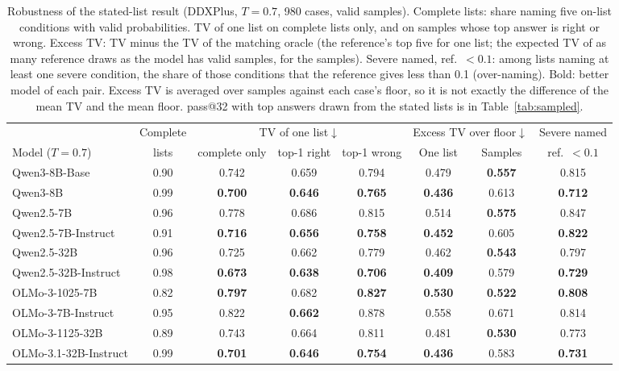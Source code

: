 \documentclass[wcp]{jmlr}
\begin{document}
\begin{table}[t]
\centering\small
\begin{adjustbox}{max width=\linewidth}
\begin{tabular}{lccccccc}
\toprule
 & Complete & \multicolumn{3}{c}{TV of one list$\downarrow$} & \multicolumn{2}{c}{Excess TV over floor$\downarrow$} & Severe named \\
Model ($T{=}0.7$) & lists & complete only & top-1 right & top-1 wrong & One list & Samples & ref.\ $<0.1$ \\
\midrule
Qwen3-8B-Base & 0.90 & 0.742 & 0.659 & 0.794 & 0.479 & \textbf{0.557} & 0.815 \\
Qwen3-8B & 0.99 & \textbf{0.700} & \textbf{0.646} & \textbf{0.765} & \textbf{0.436} & 0.613 & \textbf{0.712} \\
Qwen2.5-7B & 0.96 & 0.778 & 0.686 & 0.815 & 0.514 & \textbf{0.575} & 0.847 \\
Qwen2.5-7B-Instruct & 0.91 & \textbf{0.716} & \textbf{0.656} & \textbf{0.758} & \textbf{0.452} & 0.605 & \textbf{0.822} \\
Qwen2.5-32B & 0.96 & 0.725 & 0.662 & 0.779 & 0.462 & \textbf{0.543} & 0.797 \\
Qwen2.5-32B-Instruct & 0.98 & \textbf{0.673} & \textbf{0.638} & \textbf{0.706} & \textbf{0.409} & 0.579 & \textbf{0.729} \\
\midrule
OLMo-3-1025-7B & 0.82 & \textbf{0.797} & 0.682 & \textbf{0.827} & \textbf{0.530} & \textbf{0.522} & \textbf{0.808} \\
OLMo-3-7B-Instruct & 0.95 & 0.822 & \textbf{0.662} & 0.878 & 0.558 & 0.671 & 0.814 \\
OLMo-3-1125-32B & 0.89 & 0.743 & 0.664 & 0.811 & 0.481 & \textbf{0.530} & 0.773 \\
OLMo-3.1-32B-Instruct & 0.99 & \textbf{0.701} & \textbf{0.646} & \textbf{0.754} & \textbf{0.436} & 0.583 & \textbf{0.731} \\
\bottomrule
\end{tabular}
\end{adjustbox}
\caption{Robustness of the stated-list result (DDXPlus, $T{=}0.7$, 980 cases, valid samples). Complete lists: share naming five on-list conditions with valid probabilities. TV of one list on complete lists only, and on samples whose top answer is right or wrong. Excess TV: TV minus the TV of the matching oracle (the reference's top five for one list; the expected TV of as many reference draws as the model has valid samples, for the samples). Severe named, ref.\ $<0.1$: among lists naming at least one severe condition, the share of those conditions that the reference gives less than 0.1 (over-naming). Bold: better model of each pair. Excess TV is averaged over samples against each case's floor, so it is not exactly the difference of the mean TV and the mean floor. pass@32 with top answers drawn from the stated lists is in Table~\ref{tab:sampled}.}
\label{tab:robust}
\end{table}
\end{document}
